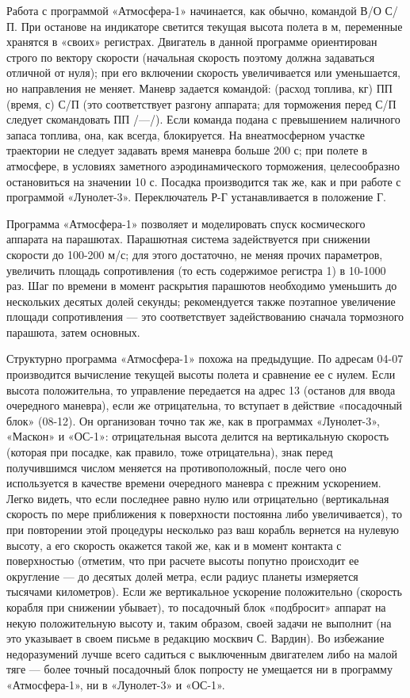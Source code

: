 \documentclass[11pt,a4paper,oneside]{article}
\begin{document}
Работа с программой «Атмосфера-1» начинается, как обычно, командой В/О С/П. При останове на индикаторе светится текущая высота полета в м, переменные хранятся в «своих» регистрах. Двигатель в данной программе ориентирован строго по вектору скорости (начальная скорость поэтому должна задаваться отличной от нуля); при его включении скорость увеличивается или уменьшается, но направления не меняет. Маневр задается командой: (расход топлива, кг) ПП (время, с) С/П (это соответствует разгону аппарата; для торможения перед С/П следует скомандовать ПП /—/). Если команда подана с превышением наличного запаса топлива, она, как всегда, блокируется. На внеатмосферном участке траектории не следует задавать время маневра больше 200 с; при полете в атмосфере, в условиях заметного аэродинамического торможения, целесообразно остановиться на значении 10 с. Посадка производится так же, как и при работе с программой «Лунолет-3». Переключатель Р-Г устанавливается в положение Г.

Программа «Атмосфера-1» позволяет и моделировать спуск космического аппарата на парашютах. Парашютная система задействуется при снижении скорости до 100-200 м/с; для этого достаточно, не меняя прочих параметров, увеличить площадь сопротивления (то есть содержимое регистра 1) в 10-1000 раз. Шаг по времени в момент раскрытия парашютов необходимо уменьшить до нескольких десятых долей секунды; рекомендуется также поэтапное увеличение площади сопротивления — это соответствует задействованию сначала тормозного парашюта, затем основных.

Структурно программа «Атмосфера-1» похожа на предыдущие. По адресам 04-07 производится вычисление текущей высоты полета и сравнение ее с нулем. Если высота положительна, то управление передается на адрес 13 (останов для ввода очередного маневра), если же отрицательна, то вступает в действие «посадочный блок» (08-12). Он организован точно так же, как в программах «Лунолет-3», «Маскон» и «ОС-1»: отрицательная высота делится на вертикальную скорость (которая при посадке, как правило, тоже отрицательна), знак перед получившимся числом меняется на противоположный, после чего оно используется в качестве времени очередного маневра с прежним ускорением. Легко видеть, что если последнее равно нулю или отрицательно (вертикальная скорость по мере приближения к поверхности постоянна либо увеличивается), то при повторении этой процедуры несколько раз ваш корабль вернется на нулевую высоту, а его скорость окажется такой же, как и в момент контакта с поверхностью (отметим, что при расчете высоты попутно происходит ее округление — до десятых долей метра, если радиус планеты измеряется тысячами километров). Если же вертикальное ускорение положительно (скорость корабля при снижении убывает), то посадочный блок «подбросит» аппарат на некую положительную высоту и, таким образом, своей задачи не выполнит (на это указывает в своем письме в редакцию москвич С. Вардин). Во избежание недоразумений лучше всего садиться с выключенным двигателем либо на малой тяге — более точный посадочный блок попросту не умещается ни в программу «Атмосфера-1», ни в «Лунолет-3» и «ОС-1».
\end{document}
